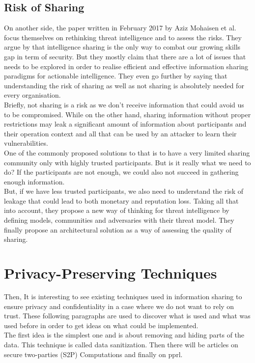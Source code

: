 \documentclass{eplmastersthesis}
\begin{document}
\subsection{Risk of Sharing}
On another side, the paper written in February 2017 by Aziz Mohaisen et al. \cite{mohaisen2017rethinking} focus themselves on rethinking threat intelligence and to assess the risks. They argue by \cite{MalikThreat} that intelligence sharing is the only way to combat our growing skills gap in term of security. But they mostly claim that there are a lot of issues that needs to be explored in order to realise efficient and effective information sharing paradigms for actionable intelligence. They even go further by saying that understanding the risk of sharing as well as not sharing is absolutely needed for every organisation.\\
Briefly, not sharing is a risk as we don't receive information that could avoid us to be compromised. While on the other hand, sharing information without proper restrictions may leak a significant amount of information about participants and their operation context and all that can be used by an attacker to learn their vulnerabilities.\\
One of the commonly proposed solutions to that is to have a very limited sharing community only with highly trusted participants. But is it really what we need to do? If the participants are not enough, we could also not succeed in gathering enough information.\\
But, if we have less trusted participants, we also need to understand the risk of leakage that could lead to both monetary and reputation loss. Taking all that into account, they propose a new way of thinking for threat intelligence by defining models, communities and adversaries with their threat model.
They finally propose an architectural solution as a way of assessing the quality of sharing.

\section{Privacy-Preserving Techniques}
Then, It is interesting to see existing techniques used in information sharing to ensure privacy and confidentiality in a case where we do not want to rely on trust. These following paragraphs are used to discover what is used and what was used before in order to get ideas on what could be implemented.\\

The first idea is the simplest one and is about removing and hiding parts of the data. This technique is called data sanitization. Then there will be articles on secure two-parties (S2P) Computations and finally on \gls{pprl}.\\
\end{document}
